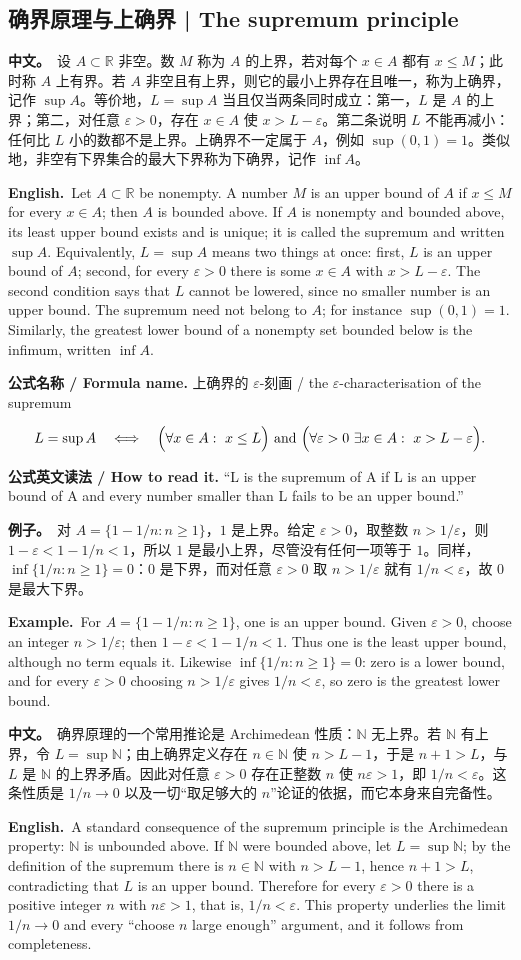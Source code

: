 \documentclass[UTF8,11pt,a4paper]{ctexart}
\newcommand{\BOTH}[2]{\par\noindent\textbf{中文。}\ #1\par\noindent\textbf{English.}\ #2\par}
\newcommand{\EX}[2]{\par\noindent\textbf{例子。}\ #1\par\noindent\textbf{Example.}\ #2\par}
\newcommand{\READ}[1]{\par\noindent\textbf{公式英文读法 / How to read it.} #1\par}
\newcommand{\FORMULA}[2]{\par\noindent\textbf{公式名称 / Formula name.} #1 / #2\par}
\begin{document}
\subsection{确界原理与上确界 | The supremum principle}
\BOTH{设 $A\subset\mathbb R$ 非空。数 $M$ 称为 $A$ 的上界，若对每个 $x\in A$ 都有 $x\le M$；此时称 $A$ 上有界。若 $A$ 非空且有上界，则它的最小上界存在且唯一，称为上确界，记作 $\sup A$。等价地，$L=\sup A$ 当且仅当两条同时成立：第一，$L$ 是 $A$ 的上界；第二，对任意 $\varepsilon>0$，存在 $x\in A$ 使 $x>L-\varepsilon$。第二条说明 $L$ 不能再减小：任何比 $L$ 小的数都不是上界。上确界不一定属于 $A$，例如 $\sup(0,1)=1$。类似地，非空有下界集合的最大下界称为下确界，记作 $\inf A$。}{Let $A\subset\mathbb R$ be nonempty. A number $M$ is an upper bound of $A$ if $x\le M$ for every $x\in A$; then $A$ is bounded above. If $A$ is nonempty and bounded above, its least upper bound exists and is unique; it is called the supremum and written $\sup A$. Equivalently, $L=\sup A$ means two things at once: first, $L$ is an upper bound of $A$; second, for every $\varepsilon>0$ there is some $x\in A$ with $x>L-\varepsilon$. The second condition says that $L$ cannot be lowered, since no smaller number is an upper bound. The supremum need not belong to $A$; for instance $\sup(0,1)=1$. Similarly, the greatest lower bound of a nonempty set bounded below is the infimum, written $\inf A$.}
\FORMULA{上确界的 $\varepsilon$-刻画}{the $\varepsilon$-characterisation of the supremum}
\[
L=\sup A\quad\Longleftrightarrow\quad
\Bigl(\forall x\in A:\ x\le L\Bigr)
\ \text{and}\
\Bigl(\forall \varepsilon>0\ \exists x\in A:\ x>L-\varepsilon\Bigr).
\]
\READ{“L is the supremum of A if L is an upper bound of A and every number smaller than L fails to be an upper bound.”}
\EX{对 $A=\{1-1/n:n\ge1\}$，$1$ 是上界。给定 $\varepsilon>0$，取整数 $n>1/\varepsilon$，则 $1-\varepsilon<1-1/n<1$，所以 $1$ 是最小上界，尽管没有任何一项等于 $1$。同样，$\inf\{1/n:n\ge1\}=0$：$0$ 是下界，而对任意 $\varepsilon>0$ 取 $n>1/\varepsilon$ 就有 $1/n<\varepsilon$，故 $0$ 是最大下界。}{For $A=\{1-1/n:n\ge1\}$, one is an upper bound. Given $\varepsilon>0$, choose an integer $n>1/\varepsilon$; then $1-\varepsilon<1-1/n<1$. Thus one is the least upper bound, although no term equals it. Likewise $\inf\{1/n:n\ge1\}=0$: zero is a lower bound, and for every $\varepsilon>0$ choosing $n>1/\varepsilon$ gives $1/n<\varepsilon$, so zero is the greatest lower bound.}
\BOTH{确界原理的一个常用推论是 Archimedean 性质：$\mathbb N$ 无上界。若 $\mathbb N$ 有上界，令 $L=\sup\mathbb N$；由上确界定义存在 $n\in\mathbb N$ 使 $n>L-1$，于是 $n+1>L$，与 $L$ 是 $\mathbb N$ 的上界矛盾。因此对任意 $\varepsilon>0$ 存在正整数 $n$ 使 $n\varepsilon>1$，即 $1/n<\varepsilon$。这条性质是 $1/n\to0$ 以及一切“取足够大的 $n$”论证的依据，而它本身来自完备性。}{A standard consequence of the supremum principle is the Archimedean property: $\mathbb N$ is unbounded above. If $\mathbb N$ were bounded above, let $L=\sup\mathbb N$; by the definition of the supremum there is $n\in\mathbb N$ with $n>L-1$, hence $n+1>L$, contradicting that $L$ is an upper bound. Therefore for every $\varepsilon>0$ there is a positive integer $n$ with $n\varepsilon>1$, that is, $1/n<\varepsilon$. This property underlies the limit $1/n\to0$ and every “choose $n$ large enough” argument, and it follows from completeness.}
\end{document}
